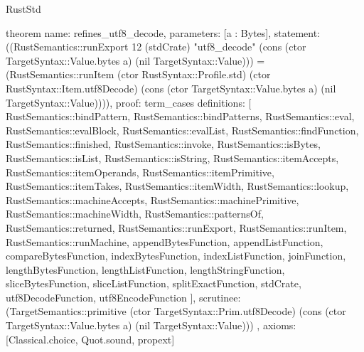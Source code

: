 \begin{lexlean}{RustStd}
\begin{semanticmodule}
theorem{
  name: refines_utf8_decode,
  parameters: [a : Bytes],
  statement: ((RustSemantics::runExport 12 (stdCrate) "utf8_decode" (cons (ctor TargetSyntax::Value.bytes a) (nil TargetSyntax::Value))) = (RustSemantics::runItem (ctor RustSyntax::Profile.std) (ctor RustSyntax::Item.utf8Decode) (cons (ctor TargetSyntax::Value.bytes a) (nil TargetSyntax::Value)))),
  proof: term_cases{
    definitions: [
      RustSemantics::bindPattern,
      RustSemantics::bindPatterns,
      RustSemantics::eval,
      RustSemantics::evalBlock,
      RustSemantics::evalList,
      RustSemantics::findFunction,
      RustSemantics::finished,
      RustSemantics::invoke,
      RustSemantics::isBytes,
      RustSemantics::isList,
      RustSemantics::isString,
      RustSemantics::itemAccepts,
      RustSemantics::itemOperands,
      RustSemantics::itemPrimitive,
      RustSemantics::itemTakes,
      RustSemantics::itemWidth,
      RustSemantics::lookup,
      RustSemantics::machineAccepts,
      RustSemantics::machinePrimitive,
      RustSemantics::machineWidth,
      RustSemantics::patternsOf,
      RustSemantics::returned,
      RustSemantics::runExport,
      RustSemantics::runItem,
      RustSemantics::runMachine,
      appendBytesFunction,
      appendListFunction,
      compareBytesFunction,
      indexBytesFunction,
      indexListFunction,
      joinFunction,
      lengthBytesFunction,
      lengthListFunction,
      lengthStringFunction,
      sliceBytesFunction,
      sliceListFunction,
      splitExactFunction,
      stdCrate,
      utf8DecodeFunction,
      utf8EncodeFunction
    ],
    scrutinee: (TargetSemantics::primitive (ctor TargetSyntax::Prim.utf8Decode) (cons (ctor TargetSyntax::Value.bytes a) (nil TargetSyntax::Value)))
  },
  axioms: [Classical.choice, Quot.sound, propext]
}


\end{semanticmodule}
\end{lexlean}
